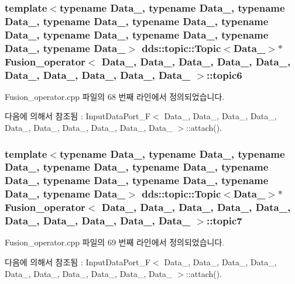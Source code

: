 \subsubsection[{\texorpdfstring{topic6}{topic6}}]{\setlength{\rightskip}{0pt plus 5cm}template$<$typename Data\+\_, typename Data\+\_, typename Data\+\_, typename Data\+\_, typename Data\+\_, typename Data\+\_, typename Data\+\_, typename Data\+\_, typename Data\+\_, typename Data\+\_$>$ dds\+::topic\+::\+Topic$<$Data\+\_$>$$\ast$ {\bf Fusion\+\_\+operator}$<$ Data\+\_, Data\+\_, Data\+\_, Data\+\_, Data\+\_, Data\+\_, Data\+\_, Data\+\_, Data\+\_, Data\+\_ $>$\+::topic6}\hypertarget{classFusion__operator_a747b20c14e1a835bb763694a1368d857}{}\label{classFusion__operator_a747b20c14e1a835bb763694a1368d857}


Fusion\+\_\+operator.\+cpp 파일의 68 번째 라인에서 정의되었습니다.



다음에 의해서 참조됨 \+:  Input\+Data\+Port\+\_\+\+F$<$ Data\+\_, Data\+\_, Data\+\_, Data\+\_, Data\+\_, Data\+\_, Data\+\_, Data\+\_, Data\+\_, Data\+\_ $>$\+::attach().

\subsubsection[{\texorpdfstring{topic7}{topic7}}]{\setlength{\rightskip}{0pt plus 5cm}template$<$typename Data\+\_, typename Data\+\_, typename Data\+\_, typename Data\+\_, typename Data\+\_, typename Data\+\_, typename Data\+\_, typename Data\+\_, typename Data\+\_, typename Data\+\_$>$ dds\+::topic\+::\+Topic$<$Data\+\_$>$$\ast$ {\bf Fusion\+\_\+operator}$<$ Data\+\_, Data\+\_, Data\+\_, Data\+\_, Data\+\_, Data\+\_, Data\+\_, Data\+\_, Data\+\_, Data\+\_ $>$\+::topic7}\hypertarget{classFusion__operator_abeb8122aebb4d834cb3433aaa99365dd}{}\label{classFusion__operator_abeb8122aebb4d834cb3433aaa99365dd}


Fusion\+\_\+operator.\+cpp 파일의 69 번째 라인에서 정의되었습니다.



다음에 의해서 참조됨 \+:  Input\+Data\+Port\+\_\+\+F$<$ Data\+\_, Data\+\_, Data\+\_, Data\+\_, Data\+\_, Data\+\_, Data\+\_, Data\+\_, Data\+\_, Data\+\_ $>$\+::attach().

